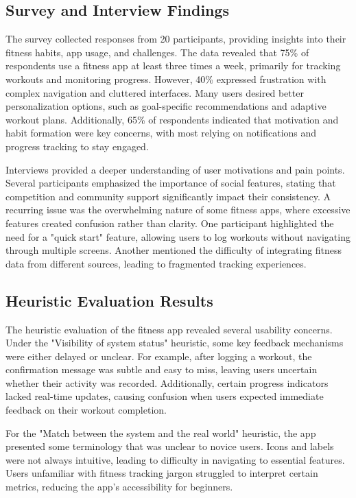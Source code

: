\documentclass[
	letterpaper, %
]{jdf}
\begin{document}
\subsection {Survey and Interview Findings}
The survey collected responses from 20 participants, providing insights into their fitness habits, app usage, and challenges. The data revealed that 75\% of respondents use a fitness app at least three times a week, primarily for tracking workouts and monitoring progress. However, 40\% expressed frustration with complex navigation and cluttered interfaces. Many users desired better personalization options, such as goal-specific recommendations and adaptive workout plans. Additionally, 65\% of respondents indicated that motivation and habit formation were key concerns, with most relying on notifications and progress tracking to stay engaged.

Interviews provided a deeper understanding of user motivations and pain points. Several participants emphasized the importance of social features, stating that competition and community support significantly impact their consistency. A recurring issue was the overwhelming nature of some fitness apps, where excessive features created confusion rather than clarity. One participant highlighted the need for a "quick start" feature, allowing users to log workouts without navigating through multiple screens. Another mentioned the difficulty of integrating fitness data from different sources, leading to fragmented tracking experiences.

\subsection {Heuristic Evaluation Results}
The heuristic evaluation of the fitness app revealed several usability concerns. Under the "Visibility of system status" heuristic, some key feedback mechanisms were either delayed or unclear. For example, after logging a workout, the confirmation message was subtle and easy to miss, leaving users uncertain whether their activity was recorded. Additionally, certain progress indicators lacked real-time updates, causing confusion when users expected immediate feedback on their workout completion.

For the "Match between the system and the real world" heuristic, the app presented some terminology that was unclear to novice users. Icons and labels were not always intuitive, leading to difficulty in navigating to essential features. Users unfamiliar with fitness tracking jargon struggled to interpret certain metrics, reducing the app’s accessibility for beginners.
\end{document}
